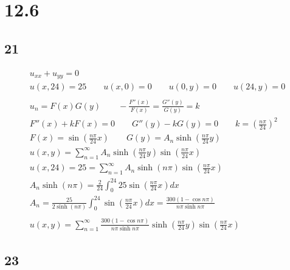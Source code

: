 \newpage


\section*{12.6}

\subsection*{21}


\begin{gather*}
	u_{xx} + u_{yy} = 0
	\\
	u(x, 24) = 25
	\qquad
	u(x, 0) = 0
	\qquad
	u(0, y) = 0
	\qquad
	u(24, y) = 0
	\\
	\\
	u_n = F(x) G(y)
	\qquad
	-\frac{F''(x)}{F(x)} = \frac{G''(y)}{G(y)} = k
	\\
	F''(x) + k F(x) = 0
	\qquad
	G''(y) - k G(y) = 0
	\qquad
	k = \left(\frac{n \pi}{24}\right)^2
	\\
	F(x) = \sin{\left(
		\frac{n \pi}{24} x
	\right)}
	\qquad
	G(y) = A_n \sinh{\left(
		\frac{n \pi}{24} y
	\right)}
	\\
	u(x, y) = \sum_{n = 1}^\infty{
		A_n \sinh{\left(
			\frac{n \pi}{24} y
		\right)}
		\sin{\left(
			\frac{n \pi}{24} x
		\right)}
	}
	\\
	u(x, 24) = 25 = \sum_{n = 1}^\infty{
		A_n \sinh{\left(
			n \pi
		\right)}
		\sin{\left(
			\frac{n \pi}{24} x
		\right)}
	}
	\\
	A_n \sinh{(n \pi)} = \frac{2}{24} \int_0^{24}{25 \sin{\left(
		\frac{n \pi}{24} x
	\right)}dx}
	\\
	A_n = \frac{25}{2 \sinh{(n \pi)}} \int_0^{24}{
		\sin{\left(\frac{n \pi}{24} x\right)} dx
	}
	=
	\frac{300 \left(1 - \cos{n \pi}\right)}{n \pi \sinh{n \pi}}
	\\
	\\
	u(x, y) = \sum_{n = 1}^\infty{
		\frac{300 \left(1 - \cos{n \pi}\right)}{n \pi \sinh{n \pi}}
		\sinh{\left(
			\frac{n \pi}{24} y
		\right)} \sin{\left(\frac{n \pi}{24} x\right)}
	}
\end{gather*}


\subsection*{23}



